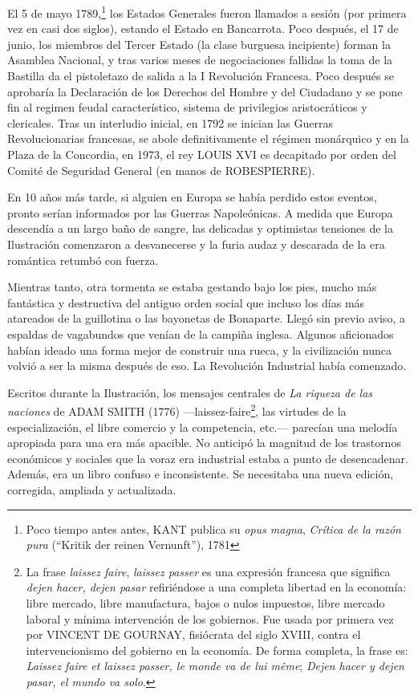 \documentclass[10pt,a4paper]{article}
\begin{document}
El 5 de mayo 1789,\footnote{%
    Poco tiempo antes antes, KANT publica su \textit{opus magna}, \textit{Crítica de la razón pura} (“Kritik der reinen Vernunft”), 1781
} los Estados Generales fueron llamados a sesión (por primera vez en casi dos siglos), estando el Estado en Bancarrota. Poco después, el 17 de junio, los miembros del Tercer Estado (la clase burguesa incipiente) forman la Asamblea Nacional, y tras varios meses de negociaciones fallidas la toma de la Bastilla da el pistoletazo de salida a la I Revolución Francesa. Poco después se aprobaría la Declaración de los Derechos del Hombre y del Ciudadano y se pone fin al regimen feudal característico, sistema de privilegios aristocráticos y clericales. Tras un interludio inicial, en 1792 se inician las Guerras Revolucionarias francesas, se abole definitivamente el régimen monárquico y en la Plaza de la Concordia, en 1973, el rey LOUIS XVI es decapitado por orden del Comité de Seguridad General (en manos de ROBESPIERRE). 

En 10 años más tarde, si alguien en Europa se había perdido estos eventos, pronto serían informados por las Guerras Napoleónicas. A medida que Europa descendía a un largo baño de sangre, las delicadas y optimistas tensiones de la Ilustración comenzaron a desvanecerse y la furia audaz y descarada de la era romántica retumbó con fuerza.

Mientras tanto, otra tormenta se estaba gestando bajo los pies, mucho más fantástica y destructiva del antiguo orden social que incluso los días más atareados de la guillotina o las bayonetas de Bonaparte. Llegó sin previo aviso, a espaldas de vagabundos que venían de la campiña inglesa. Algunos aficionados habían ideado una forma mejor de construir una rueca, y la civilización nunca volvió a ser la misma después de eso. La Revolución Industrial había comenzado.

Escritos durante la Ilustración, los mensajes centrales de \textit{La riqueza de las naciones} de ADAM SMITH (1776) —laissez-faire\footnote{%
    La frase \textit{laissez faire}, \textit{laissez passer} es una expresión francesa que significa \textit{dejen hacer, dejen pasar} refiriéndose a una completa libertad en la economía: libre mercado, libre manufactura, bajos o nulos impuestos, libre mercado laboral y mínima intervención de los gobiernos. Fue usada por primera vez por VINCENT DE GOURNAY, fisiócrata del siglo XVIII, contra el intervencionismo del gobierno en la economía. De forma completa, la frase es: \textit{Laissez faire et laissez passer, le monde va de lui même}; \textit{Dejen hacer y dejen pasar, el mundo va solo}.
}, las virtudes de la especialización, el libre comercio y la competencia, etc.— parecían una melodía apropiada para una era más apacible. No anticipó la magnitud de los trastornos económicos y sociales que la voraz era industrial estaba a punto de desencadenar. Además, era un libro confuso e inconsistente. Se necesitaba una nueva edición, corregida, ampliada y actualizada.
\end{document}
